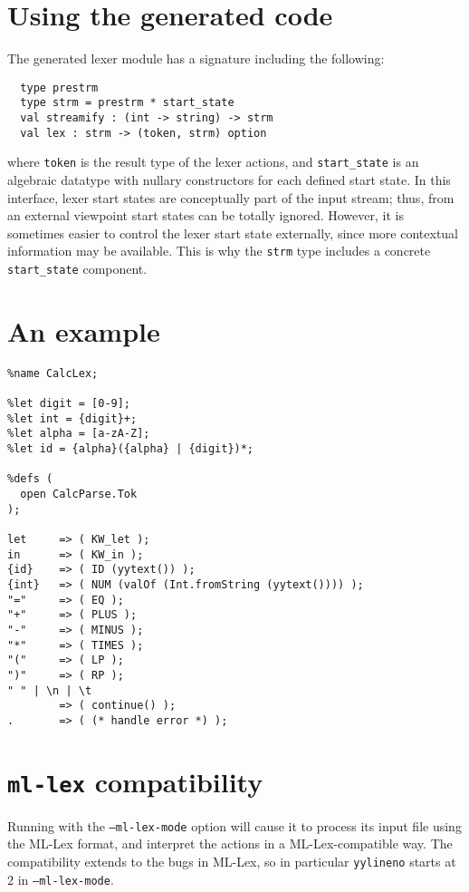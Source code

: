 \section{Using the generated code}

The generated lexer module has a signature including the following:
\begin{verbatim}
  type prestrm
  type strm = prestrm * start_state
  val streamify : (int -> string) -> strm
  val lex : strm -> (token, strm) option
\end{verbatim}
where \texttt{token} is the result type of the lexer actions, and \texttt{start\_state} is an algebraic datatype with nullary constructors for each defined start state.  In this interface, lexer start states are conceptually part of the input stream; thus, from an external viewpoint start states can be totally ignored.  However, it is sometimes easier to control the lexer start state externally, since more contextual information may be available.  This is why the \texttt{strm} type includes a concrete \texttt{start\_state} component.

\section{An example}
\begin{verbatim}
%name CalcLex;

%let digit = [0-9];
%let int = {digit}+;
%let alpha = [a-zA-Z];
%let id = {alpha}({alpha} | {digit})*;

%defs (
  open CalcParse.Tok
);

let     => ( KW_let );
in      => ( KW_in );
{id}    => ( ID (yytext()) );
{int}   => ( NUM (valOf (Int.fromString (yytext()))) );
"="     => ( EQ );
"+"     => ( PLUS );
"-"     => ( MINUS );
"*"     => ( TIMES );
"("     => ( LP );
")"     => ( RP );
" " | \n | \t
        => ( continue() );
.       => ( (* handle error *) );
\end{verbatim}

\section{{\tt ml-lex} compatibility}\label{sec:lex-compat}

Running \ulex{} with the {\tt --ml-lex-mode} option will cause it to process its input file using the ML-Lex format, and interpret the actions in a ML-Lex-compatible way.  The compatibility extends to the bugs in ML-Lex, so in particular \texttt{yylineno} starts at 2 in {\tt --ml-lex-mode}.